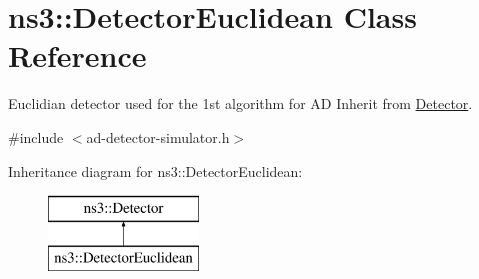 \hypertarget{classns3_1_1DetectorEuclidean}{}\section{ns3\+:\+:Detector\+Euclidean Class Reference}
\label{classns3_1_1DetectorEuclidean}


Euclidian detector used for the 1st algorithm for A\+D Inherit from \hyperlink{classns3_1_1Detector}{Detector}.  




{\ttfamily \#include $<$ad-\/detector-\/simulator.\+h$>$}

Inheritance diagram for ns3\+:\+:Detector\+Euclidean\+:\begin{figure}[H]
\begin{center}
\leavevmode
\includegraphics[height=2.000000cm]{classns3_1_1DetectorEuclidean}
\end{center}
\end{figure}
